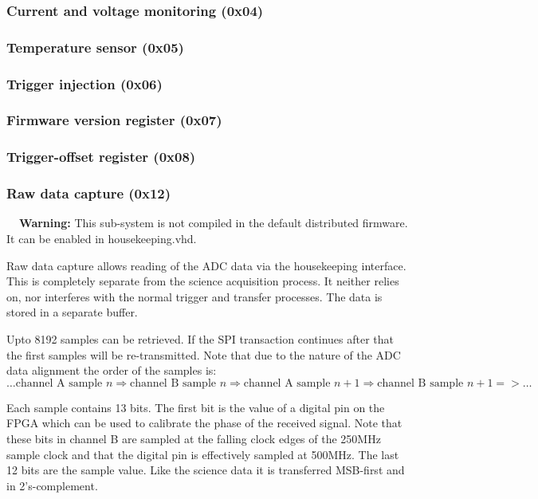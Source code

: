 \documentclass[a4paper,indent]{paper}
\newenvironment{warning}
{\par\begin{mdframed}[linewidth=2pt,linecolor=orange,backgroundcolor=orange!10]%
    \begin{list}{}{\leftmargin=0mm}\item[\bf\danger{}~~Warning: ]}
  {\end{list}\end{mdframed}\par}
\begin{document}
\subsubsection{Current and voltage monitoring (0x04)}

\subsubsection{Temperature sensor (0x05)}

\subsubsection{Trigger injection (0x06)}

\subsubsection{Firmware version register (0x07)}

\subsubsection{Trigger-offset register (0x08)}

\subsubsection{Raw data capture (0x12)}

\begin{warning}
  This sub-system is not compiled in the default distributed firmware. It can be enabled in housekeeping.vhd.
\end{warning}

Raw data capture allows reading of the ADC data via the housekeeping interface.
This is completely separate from the science acquisition process.
It neither relies on, nor interferes with the normal trigger and transfer processes.
The data is stored in a separate buffer.

Upto 8192 samples can be retrieved. If the \ac{SPI} transaction continues after that the first samples will be re-transmitted. Note that due to the nature of the \ac{ADC} data alignment the order of the samples is:
$$
\ldots \text{channel A sample } n \Rightarrow \text{channel B sample } n \Rightarrow \text{channel A sample } n+1 \Rightarrow \text{channel B sample } n+1 => \ldots
$$

Each sample contains 13 bits. The first bit is the value of a digital pin on the \ac{FPGA} which can be used to calibrate the phase of the received signal. Note that these bits in channel B are sampled at the falling clock edges of the 250MHz sample clock and that the digital pin is effectively sampled at 500MHz. The last 12 bits are the sample value. Like the science data it is transferred MSB-first and in 2's-complement. 
\end{document}
